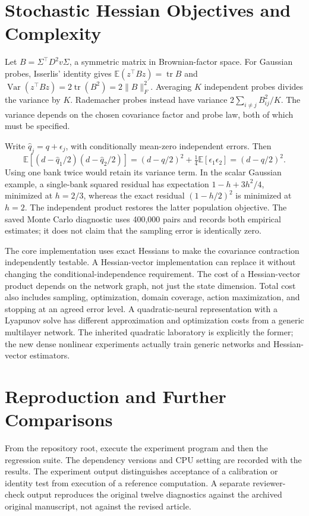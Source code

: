 \documentclass[ecta,draft]{econsocart}
\newcommand{\E}{\mathbb E}
\newcommand{\tr}{\operatorname{tr}}
\begin{document}
\section{Stochastic Hessian Objectives and Complexity}
Let $B=\Sigma^\top D^2v\Sigma$, a symmetric matrix in Brownian-factor space. For Gaussian probes, Isserlis' identity gives $\E(z^\top Bz)=\tr B$ and $\operatorname{Var}(z^\top Bz)=2\tr(B^2)=2\|B\|_F^2$. Averaging $K$ independent probes divides the variance by $K$. Rademacher probes instead have variance $2\sum_{i\ne j}B_{ij}^2/K$. The variance depends on the chosen covariance factor and probe law, both of which must be specified.

Write $\widehat q_j=q+\epsilon_j$, with conditionally mean-zero independent errors. Then
\[
 \E[(d-\widehat q_1/2)(d-\widehat q_2/2)]
 =(d-q/2)^2+\tfrac14\E[\epsilon_1\epsilon_2]=(d-q/2)^2.
\]
Using one bank twice would retain its variance term. In the scalar Gaussian example, a single-bank squared residual has expectation $1-h+3h^2/4$, minimized at $h=2/3$, whereas the exact residual $(1-h/2)^2$ is minimized at $h=2$. The independent product restores the latter population objective. The saved Monte Carlo diagnostic uses 400,000 pairs and records both empirical estimates; it does not claim that the sampling error is identically zero.

The core implementation uses exact Hessians to make the covariance contraction independently testable. A Hessian-vector implementation can replace it without changing the conditional-independence requirement. The cost of a Hessian-vector product depends on the network graph, not just the state dimension. Total cost also includes sampling, optimization, domain coverage, action maximization, and stopping at an agreed error level. A quadratic-neural representation with a Lyapunov solve has different approximation and optimization costs from a generic multilayer network. The inherited quadratic laboratory is explicitly the former; the new dense nonlinear experiments actually train generic networks and Hessian-vector estimators.

\section{Reproduction and Further Comparisons}
From the repository root, execute the experiment program and then the regression suite. The dependency versions and CPU setting are recorded with the results. The experiment output distinguishes acceptance of a calibration or identity test from execution of a reference computation. A separate reviewer-check output reproduces the original twelve diagnostics against the archived original manuscript, not against the revised article.
\end{document}
